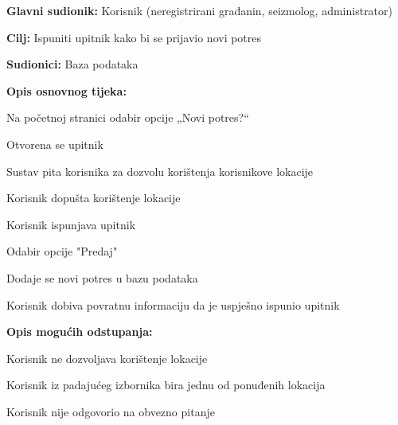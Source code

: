 			\noindent {}
			\begin{packed_item}
				
				\item \textbf{Glavni sudionik:} Korisnik (neregistrirani građanin, seizmolog, administrator)
				\item \textbf{Cilj:} Ispuniti upitnik kako bi se prijavio novi potres
				\item \textbf{Sudionici:} Baza podataka
				
				\item \textbf{Opis osnovnog tijeka:}
				
				\item[] \begin{packed_enum}
					\item Na početnoj stranici odabir opcije „Novi potres?“
					\item Otvorena se upitnik
					\item Sustav pita korisnika za dozvolu korištenja korisnikove lokacije
					\item Korisnik dopušta korištenje lokacije 
					\item Korisnik ispunjava upitnik
					\item Odabir opcije "Predaj"
					\item Dodaje se novi potres u bazu podataka
					\item Korisnik dobiva povratnu informaciju da je uspješno ispunio upitnik
				\end{packed_enum}
				
				\item  \textbf{Opis mogućih odstupanja:}
				
				\item[] \begin{packed_item}
				    \item[4.a] Korisnik ne dozvoljava korištenje lokacije
					\item[] \begin{packed_enum}
						
						\item Korisnik iz padajućeg izbornika bira jednu od ponuđenih lokacija						
					\end{packed_enum} 
					
					\item[5.a] Korisnik nije odgovorio na obvezno pitanje
					\item[] \begin{packed_enum}
						

\end{packed_enum}
\end{packed_item}
\end{packed_item}
